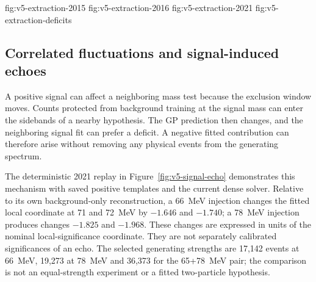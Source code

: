 {fig:v5-extraction-2015}
{fig:v5-extraction-2016}
{fig:v5-extraction-2021}
{fig:v5-extraction-deficits}
\FloatBarrier

\subsection{Correlated fluctuations and signal-induced echoes}
\label{sec:echo}\label{sec:v5-echo}

A positive signal can affect a neighboring mass test because the exclusion
window moves. Counts protected from background training at the signal mass
can enter the sidebands of a nearby hypothesis. The GP prediction then
changes, and the neighboring signal fit can prefer a deficit. A negative
fitted contribution can therefore arise without removing any physical events
from the generating spectrum.

The deterministic 2021 replay in Figure~\ref{fig:v5-signal-echo} demonstrates this mechanism with saved positive
templates and the current dense solver. Relative to its own background-only
reconstruction, a 66~MeV injection changes the fitted local coordinate at
71 and 72~MeV by $-1.646$ and $-1.740$; a 78~MeV injection produces changes
$-1.825$ and $-1.968$. These changes are expressed in units of the nominal
local-significance coordinate. They are not separately calibrated
significances of an echo. The selected generating strengths are 17,142 events
at 66~MeV, 19,273 at 78~MeV and 36,373 for the 65+78~MeV pair; the comparison
is not an equal-strength experiment or a fitted two-particle hypothesis.

